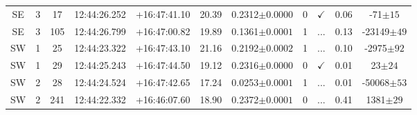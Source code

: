 \begin{landscape}
\begin{table}
\begin{tabular}{ccccccccccc}
	SE & 3 & 17 & 12:44:26.252 & +16:47:41.10 & 20.39 & 0.2312$\pm{0.0000}$ & 0 & $\checkmark$ & 0.06 & -71$\pm{15}$ \\
	SE & 3 & 105 & 12:44:26.799 & +16:47:00.82 & 19.89 & 0.1361$\pm{0.0001}$ & 1 & ... & 0.13 & -23149$\pm{49}$ \\
	SW & 1 & 25 & 12:44:23.322 & +16:47:43.10 & 21.16 & 0.2192$\pm{0.0002}$ & 1 & ... & 0.10 & -2975$\pm{92}$ \\
	SW & 1 & 29 & 12:44:25.243 & +16:47:44.50 & 19.12 & 0.2316$\pm{0.0000}$ & 0 & $\checkmark$ & 0.01 & 23$\pm{24}$ \\
	SW & 2 & 28 & 12:44:24.524 & +16:47:42.65 & 17.24 & 0.0253$\pm{0.0001}$ & 1 & ... & 0.01 & -50068$\pm{53}$ \\
	SW & 2 & 241 & 12:44:22.332 & +16:46:07.60 & 18.90 & 0.2372$\pm{0.0001}$ & 0 & ... & 0.41 & 1381$\pm{29}$ \\
			\hline
		\end{tabular}
		\label{2tbl:XMMXCSJ124425.9+164758.0}
	\end{table}
\end{landscape}

